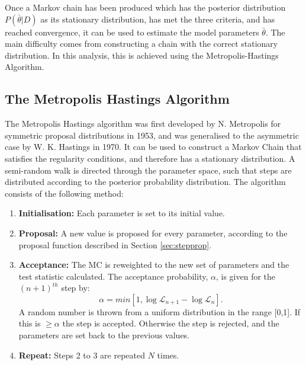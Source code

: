 Once a Markov chain has been produced which has the posterior distribution $P(\bar{\theta}|D)$ as its stationary distribution, has met the three criteria, and has reached convergence, it can be used to estimate the model parameters $\bar{\theta}$. The main difficulty comes from constructing a chain with the correct stationary distribution. In this analysis, this is achieved using the Metropolis-Hastings Algorithm.

\subsection{The Metropolis Hastings Algorithm}\label{sec:methast}

The Metropolis Hastings algorithm was first developed by N. Metropolis for symmetric proposal distributions in 1953\cite{met}, and was generalised to the asymmetric case by  W. K. Hastings in 1970\cite{methast}. It can be used to construct a Markov Chain that satisfies the regularity conditions, and therefore has a stationary distribution. A semi-random walk is directed through the parameter space, such that steps are distributed according to the posterior probability distribution. The algorithm consists of the following method:

\begin{enumerate}
\item \textbf{Initialisation:} Each parameter is set to its initial value. \\
\item \textbf{Proposal:} A new value is proposed for every parameter, according to the proposal function described in Section \ref{sec:stepprop}. \\
\item \textbf{Acceptance:} The MC is reweighted to the new set of parameters and the test statistic calculated. The acceptance probability, $\alpha$, is given for the $(n+1)^{th}$ step by:
\begin{equation}
\alpha = min[1, \log\mathcal{L}_{n+1} - \log \mathcal{L}_{n}].
\end{equation}
 A random number is thrown from a uniform distribution in the range [0,1]. If this is $\geq \alpha$ the step is accepted. Otherwise the step is rejected, and the parameters are set back to the previous values.  \\
\item \textbf{Repeat:} Steps 2 to 3 are repeated $N$ times. \\
\end{enumerate}

